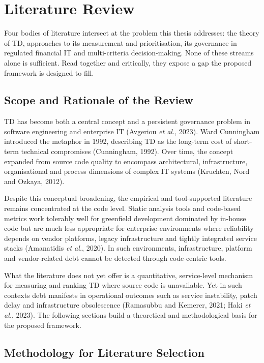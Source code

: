 \documentclass[
  12pt,
  letterpaper,
  12pt,
  oneside,
  english,
  onehalfspacing,
  headsepline]{MastersDoctoralThesis}
\begin{document}

\chapter{Literature Review}\label{sec-chapter2}

Four bodies of literature intersect at the problem this thesis
addresses: the theory of TD, approaches to its measurement and
prioritisation, its governance in regulated financial IT and
multi-criteria decision-making. None of these streams alone is
sufficient. Read together and critically, they expose a gap the proposed
framework is designed to fill.

\section{Scope and Rationale of the
Review}\label{scope-and-rationale-of-the-review}

TD has become both a central concept and a persistent governance problem
in software engineering and enterprise IT (Avgeriou \emph{et al.},
2023). Ward Cunningham introduced the metaphor in 1992, describing TD as
the long-term cost of short-term technical compromises (Cunningham,
1992). Over time, the concept expanded from source code quality to
encompass architectural, infrastructure, organisational and process
dimensions of complex IT systems (Kruchten, Nord and Ozkaya, 2012).

Despite this conceptual broadening, the empirical and tool-supported
literature remains concentrated at the code level. Static analysis tools
and code-based metrics work tolerably well for greenfield development
dominated by in-house code but are much less appropriate for enterprise
environments where reliability depends on vendor platforms, legacy
infrastructure and tightly integrated service stacks (Amanatidis
\emph{et al.}, 2020). In such environments, infrastructure, platform and
vendor-related debt cannot be detected through code-centric tools.

What the literature does not yet offer is a quantitative, service-level
mechanism for measuring and ranking TD where source code is unavailable.
Yet in such contexts debt manifests in operational outcomes such as
service instability, patch delay and infrastructure obsolescence
(Ramasubbu and Kemerer, 2021; Haki \emph{et al.}, 2023). The following
sections build a theoretical and methodological basis for the proposed
framework.

\section{Methodology for Literature
Selection}\label{methodology-for-literature-selection}
\end{document}
